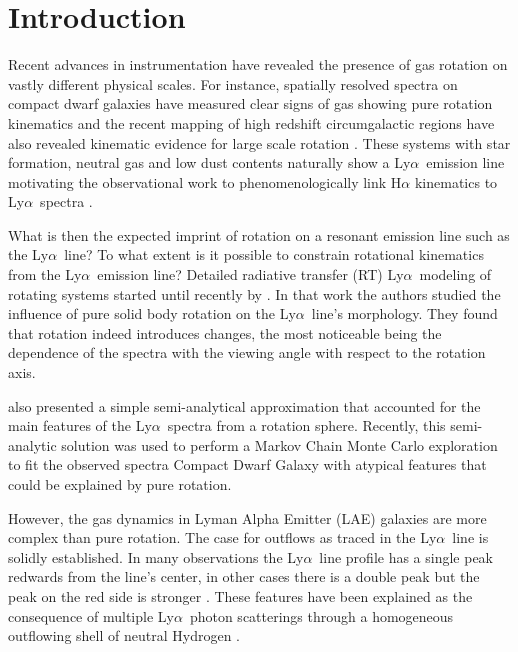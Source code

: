 \documentclass[a4paper,fleqn,usenatbib]{mnras}
\newcommand{\lya}{\ifmmode{{\rm Ly}\alpha}\else Ly$\alpha$\ \fi}
\begin{document}


\section{Introduction}
\label{sec:intro}

Recent advances in instrumentation have revealed the presence of gas
rotation on vastly different physical scales.
For instance, spatially resolved spectra on compact dwarf galaxies
have measured clear signs of gas showing pure rotation kinematics
\citep{2015A&A...577A..21C,2017A&A...600A.125C} and the recent mapping of
high redshift circumgalactic regions have also revealed kinematic
evidence for large scale rotation \citep{2018MNRAS.473.3907A}.
These systems with star formation, neutral gas and low dust
contents naturally show a \lya emission line \citep{PartridgePeebles}
motivating the observational work to phenomenologically link
H$\alpha$ kinematics to \lya spectra \citep[e.g.][]{Herenz2016}. 


What is then the expected imprint of rotation on a resonant emission
line such as the \lya line? To what extent is it possible to constrain
rotational kinematics from the \lya emission line? 
Detailed radiative transfer (RT) \lya modeling of rotating systems
started until recently by \cite{Garavito14}.
In that work the authors studied the influence of pure solid body
rotation on the \lya line's morphology.
They found that rotation indeed introduces changes, the most
noticeable being the dependence of the spectra with the viewing
angle with respect to the rotation axis. 

\cite{Garavito14} also presented a simple semi-analytical
approximation that accounted for the main features of the \lya spectra
from a rotation sphere.
Recently, this semi-analytic solution was used to perform a Markov
Chain Monte Carlo exploration to fit the observed spectra Compact
Dwarf Galaxy \citep{tololo} with atypical features that could be
explained by pure rotation.  

However, the gas dynamics in Lyman Alpha Emitter (LAE) galaxies are
more complex than pure rotation.
The case for outflows as traced in the \lya line is solidly
established.  
In many observations the \lya line profile has a single peak
redwards from the line's center, in other cases there is a double peak
but the peak on the red side is stronger
\citep[e.g.][]{2010ApJ...717..289S,Erb14,Trainor16}.   
These features have been explained as the consequence of multiple
\lya photon scatterings through a homogeneous outflowing shell of
neutral Hydrogen
\citep{2006A&A...460..397V,Orsi12,2012ApJ...751...29Y,2015ApJ...812..123G}.  
\end{document}

